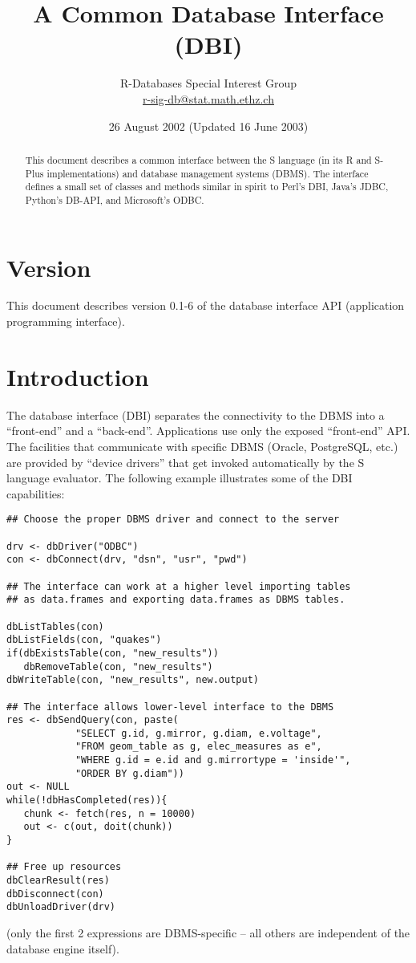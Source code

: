 \documentclass{article}
\begin{document}
\title{A Common Database Interface (DBI)}
\author{
R-Databases Special Interest Group\\
\href{mailto:r-sig-db@stat.math.ethz.ch}{r-sig-db@stat.math.ethz.ch}
}

\date{26 August 2002 (Updated 16 June 2003)}

\maketitle 
\tableofcontents

\begin{abstract}
This document describes a common interface between the S language 
(in its R and S-Plus implementations) and database management systems
(DBMS).  The interface defines a small set of classes and methods
similar in spirit to Perl's DBI, Java's JDBC, Python's DB-API,
and Microsoft's ODBC.
\end{abstract}

\section{Version}\label{sec:version}
This document describes version 0.1-6 of the database interface
API (application programming interface).

\section{Introduction}\label{sec:intro}

The database interface (DBI) separates the connectivity to the DBMS
into a ``front-end'' and a ``back-end''.  Applications use only the
exposed ``front-end'' API.  The facilities that communicate with
specific DBMS (Oracle, PostgreSQL, etc.) are provided by ``device
drivers'' that get invoked automatically by the S language evaluator.
The following example illustrates some of the DBI capabilities:
\begin{verbatim}
## Choose the proper DBMS driver and connect to the server

drv <- dbDriver("ODBC")
con <- dbConnect(drv, "dsn", "usr", "pwd")

## The interface can work at a higher level importing tables 
## as data.frames and exporting data.frames as DBMS tables.

dbListTables(con)
dbListFields(con, "quakes")
if(dbExistsTable(con, "new_results"))
   dbRemoveTable(con, "new_results")
dbWriteTable(con, "new_results", new.output)

## The interface allows lower-level interface to the DBMS
res <- dbSendQuery(con, paste(
            "SELECT g.id, g.mirror, g.diam, e.voltage",
            "FROM geom_table as g, elec_measures as e",
            "WHERE g.id = e.id and g.mirrortype = 'inside'",
            "ORDER BY g.diam"))
out <- NULL
while(!dbHasCompleted(res)){
   chunk <- fetch(res, n = 10000)
   out <- c(out, doit(chunk))
}

## Free up resources
dbClearResult(res)
dbDisconnect(con)
dbUnloadDriver(drv)
\end{verbatim}
(only the first 2 expressions are DBMS-specific -- all others are
independent of the database engine itself).
\end{document}
